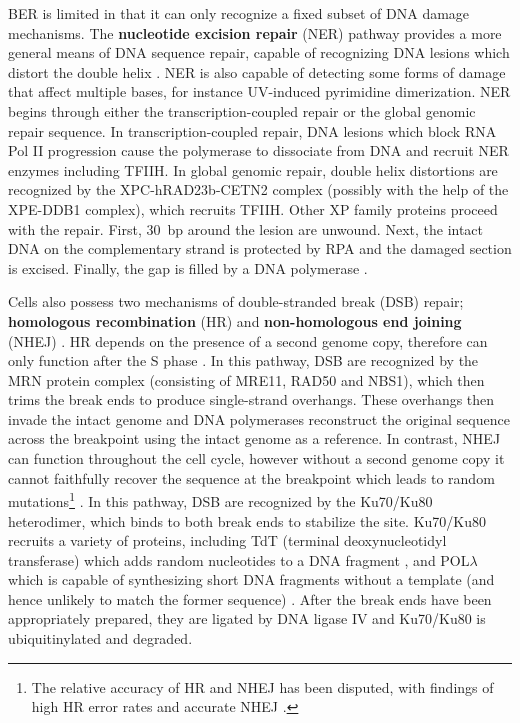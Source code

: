 BER is limited in that it can only recognize a fixed subset of DNA damage mechanisms. The \textbf{nucleotide excision repair} (NER) pathway provides a more general means of DNA sequence repair, capable of recognizing DNA lesions which distort the double helix \cite{spivak2015}. NER is also capable of detecting some forms of damage that affect multiple bases, for instance UV-induced pyrimidine dimerization. NER begins through either the transcription-coupled repair or the global genomic repair sequence. In transcription-coupled repair, DNA lesions which block RNA Pol II progression cause the polymerase to dissociate from DNA and recruit NER enzymes including TFIIH\@. In global genomic repair, double helix distortions are recognized by the XPC-hRAD23b-CETN2 complex (possibly with the help of the XPE-DDB1 complex), which recruits TFIIH\@. Other XP family proteins proceed with the repair. First, \textapprox{}30~bp around the lesion are unwound. Next, the intact DNA on the complementary strand is protected by RPA and the damaged section is excised. Finally, the gap is filled by a DNA polymerase \cite{marteijn2014}.

Cells also possess two mechanisms of double-stranded break (DSB) repair; \textbf{homologous recombination} (HR) and \textbf{non-homologous end joining} (NHEJ) \cite{mladenov2016}. HR depends on the presence of a second genome copy, therefore can only function after the S phase \cite{li2019_hr}. In this pathway, DSB are recognized by the MRN protein complex (consisting of MRE11, RAD50 and NBS1), which then trims the break ends to produce single-strand overhangs. These overhangs then invade the intact genome and DNA polymerases reconstruct the original sequence across the breakpoint using the intact genome as a reference. In contrast, NHEJ can function throughout the cell cycle, however without a second genome copy it cannot faithfully recover the sequence at the breakpoint which leads to random mutations\footnote{The relative accuracy of HR and NHEJ has been disputed, with findings of high HR error rates \cite{rodgers2015} and accurate NHEJ \cite{betermier2014}.} \cite{davis2013}. In this pathway, DSB are recognized by the Ku70/Ku80 heterodimer, which binds to both break ends to stabilize the site. Ku70/Ku80 recruits a variety of proteins, including TdT (terminal deoxynucleotidyl transferase) which adds random nucleotides to a DNA fragment \cite{boubakour2012}, and POL$\lambda$ which is capable of synthesizing short DNA fragments without a template (and hence unlikely to match the former sequence) \cite{ramadan2004}. After the break ends have been appropriately prepared, they are ligated by DNA ligase IV and Ku70/Ku80 is ubiquitinylated and degraded.


